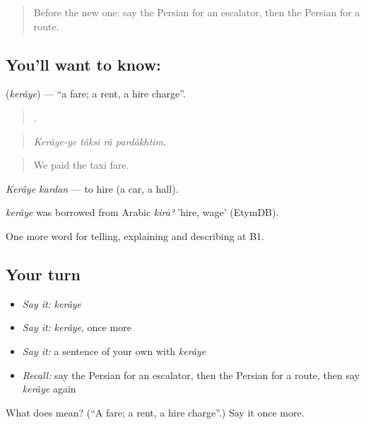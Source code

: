 \begin{quote}
Before the new one: say the Persian for an escalator, then the Persian for a route.
\end{quote}

\subsection*{You'll want to know: }
\textbf{} (\emph{kerâye}) — \textquotedblleft{}a fare; a rent, a hire charge\textquotedblright{}.

\begin{quote}
   .
\end{quote}

\begin{quote}
\emph{Kerâye-ye tâksi râ pardâkhtim.}
\end{quote}

\begin{quote}
We paid the taxi fare.
\end{quote}

\emph{Kerâye kardan} — to hire (a car, a hall).

\begin{cousinweb}
\emph{kerâye} was borrowed from Arabic \emph{kirāʾ} 'hire, wage' (EtymDB).
\end{cousinweb}

\begin{grammarlens}[title={What you've built}]
One more word for telling, explaining and describing at B1.
\end{grammarlens}

\subsection*{Your turn}
\begin{itemize}
\raggedright
  \item \emph{Say it:} \emph{kerâye}
  \item \emph{Say it:} \emph{kerâye}, once more
  \item \emph{Say it:} a sentence of your own with \emph{kerâye}
  \item \emph{Recall:} say the Persian for an escalator, then the Persian for a route, then say \emph{kerâye} again
\end{itemize}

\begin{tcolorbox}[breakable,colback=teal!4,colframe=teal!35!black,title={Before you move on}]
What does  mean? (\textquotedblleft{}A fare; a rent, a hire charge\textquotedblright{}.) Say it once more.
\end{tcolorbox}
